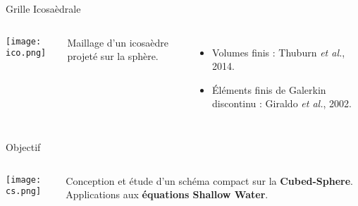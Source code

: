 \documentclass[11pt]{beamer}
\begin{document}
\begin{frame}{Grille Icosaèdrale}
\begin{columns}
\begin{center}
\texttt{[image: ico.png]}
\end{center}

Maillage d'un icosaèdre projeté sur la sphère.

\begin{itemize}
\item Volumes finis : Thuburn \textit{et al.}, 2014.
\item Éléments finis de Galerkin discontinu : Giraldo \textit{et al.}, 2002.
\end{itemize}
\end{columns}
\end{frame}



\begin{frame}{Objectif}
\begin{columns}
\begin{center}
\texttt{[image: cs.png]}
\end{center}


\begin{block}{}
Conception et étude d'un schéma compact sur la \textbf{Cubed-Sphere}. Applications aux \textbf{équations Shallow Water}.
\end{block}


\end{columns}
\end{frame}

\end{document}
